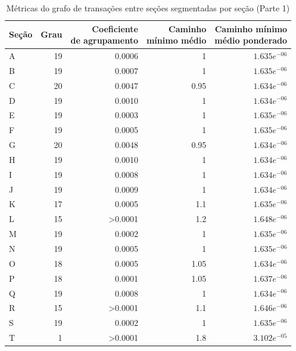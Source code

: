\begin{table}[htb]
\centering
\caption{Métricas do grafo de transações entre seções segmentadas por seção (Parte 1)}
\label{tab:metricas-redes:grafo-por-secao-especificas1}
    \begin{tabular}{l|rrrr}
    \toprule
    Seção &  Grau &  \shortstack{Coeficiente\\de agrupamento} &  \shortstack{Caminho\\mínimo médio} &  \shortstack{Caminho mínimo\\médio ponderado} \\
    \midrule
    A &  19 &          0.0006 &     1 &  $1.635e^{-06}$ \\
    B &  19 &          0.0007 &     1 &  $1.635e^{-06}$ \\
    C &  20 &          0.0047 &  0.95 &  $1.634e^{-06}$ \\
    D &  19 &          0.0010 &     1 &  $1.634e^{-06}$ \\
    E &  19 &          0.0003 &     1 &  $1.635e^{-06}$ \\
    F &  19 &          0.0005 &     1 &  $1.635e^{-06}$ \\
    G &  20 &          0.0048 &  0.95 &  $1.634e^{-06}$ \\
    H &  19 &          0.0010 &     1 &  $1.634e^{-06}$ \\
    I &  19 &          0.0008 &     1 &  $1.634e^{-06}$ \\
    J &  19 &          0.0009 &     1 &  $1.634e^{-06}$ \\
    K &  17 &          0.0005 &   1.1 &  $1.635e^{-06}$ \\
    L &  15 &         >0.0001 &   1.2 &  $1.648e^{-06}$ \\
    M &  19 &          0.0002 &     1 &  $1.635e^{-06}$ \\
    N &  19 &          0.0005 &     1 &  $1.635e^{-06}$ \\
    O &  18 &          0.0005 &  1.05 &  $1.634e^{-06}$ \\
    P &  18 &          0.0001 &  1.05 &  $1.637e^{-06}$ \\
    Q &  19 &          0.0008 &     1 &  $1.634e^{-06}$ \\
    R &  15 &         >0.0001 &   1.1 &  $1.646e^{-06}$ \\
    S &  19 &          0.0002 &     1 &  $1.635e^{-06}$ \\
    T &   1 &         >0.0001 &   1.8 &  $3.102e^{-05}$ \\
    \bottomrule
    \end{tabular}
\fdadospesquisa
\end{table}

